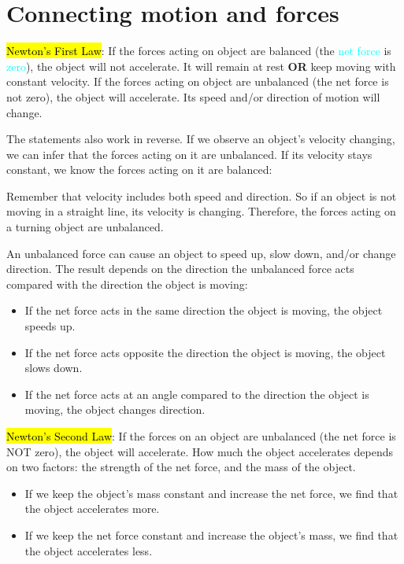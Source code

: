 \section{Connecting motion and forces}

\hl{Newton's First Law}: If the forces acting on object are balanced (the \textcolor{cyan}{net force} is \textcolor{cyan}{zero}), the object will not accelerate. It will remain at rest \textbf{OR} keep moving with constant velocity. If the forces acting on object are unbalanced (the net force is not zero), the object will accelerate. Its speed and/or direction of motion will change.

The statements also work in reverse. If we observe an object’s velocity changing, we can infer that the forces acting on it are unbalanced. If its velocity stays constant, we know the forces acting on it are balanced:

Remember that velocity includes both speed and direction. So if an object is not moving in a straight line, its velocity is changing. Therefore, the forces acting on a turning object are unbalanced.

An unbalanced force can cause an object to speed up, slow down, and/or change direction. The result depends on the direction the unbalanced force acts compared with the direction the object is moving:

\begin{itemize}
  \item If the net force acts in the same direction the object is moving, the object speeds up.
  \item If the net force acts opposite the direction the object is moving, the object slows down.
  \item If the net force acts at an angle compared to the direction the object is moving, the object changes direction.
\end{itemize}

\vspace{.4cm}

\hl{Newton's Second Law}: If the forces on an object are unbalanced (the net force is NOT zero), the object will accelerate. How much the object accelerates depends on two factors: the strength of the net force, and the mass of the object.

\begin{itemize}
  \item If we keep the object's mass constant and increase the net force, we find that the object accelerates more.
  \item If we keep the net force constant and increase the object's mass, we find that the object accelerates less.
\end{itemize}

